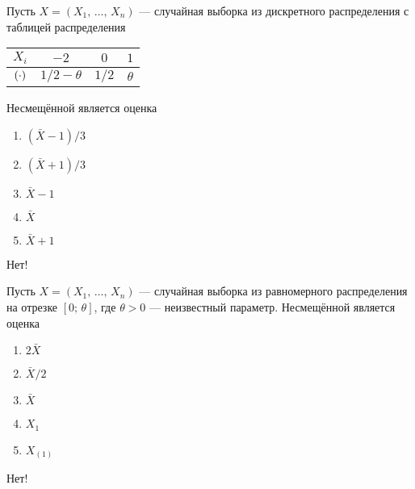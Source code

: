 \documentclass[t]{beamer}
\let\P\relax
\DeclareMathOperator{\P}{\mathbb{P}}
\begin{document}
 \begin{frame} \label{26-No} 
\begin{block}{26} 

    Пусть $X = (X_1, \, \ldots, \, X_n)$ — случайная выборка из дискретного распределения с таблицей распределения

\begin{center}
	\begin{tabular}{cccc}
		\toprule
		$X_i$  & $-2$    & $0$      & $1$  \\
		\midrule
		$\P(\cdot)$        & $1/2 - \theta$      & $1/2$    & $\theta$  \\
		\bottomrule
	\end{tabular}
\end{center}

Несмещённой является оценка


 \end{block} 
\begin{enumerate} 
\item[] \hyperlink{26-No}{\beamergotobutton{} $(\bar{X} - 1) / 3$}
\item[] \hyperlink{26-Yes}{\beamergotobutton{} $(\bar{X} + 1) / 3$}
\item[] \hyperlink{26-No}{\beamergotobutton{} $\bar{X} - 1$}
\item[] \hyperlink{26-No}{\beamergotobutton{} $\bar{X}$}
\item[] \hyperlink{26-No}{\beamergotobutton{} $\bar{X} + 1$}
\end{enumerate} 

 \alert{Нет!} 
\end{frame} 


 \begin{frame} \label{27-No} 
\begin{block}{27} 

   Пусть $X = (X_1, \, \ldots, \, X_n)$ — случайная выборка из равномерного распределения на отрезке $[0; \, \theta]$, где $\theta > 0$ — неизвестный параметр. Несмещённой является оценка


 \end{block} 
\begin{enumerate} 
\item[] \hyperlink{27-Yes}{\beamergotobutton{} $2 \bar{X}$}
\item[] \hyperlink{27-No}{\beamergotobutton{} $\bar{X} / 2$}
\item[] \hyperlink{27-No}{\beamergotobutton{} $\bar{X}$}
\item[] \hyperlink{27-No}{\beamergotobutton{} $X_1$}
\item[] \hyperlink{27-No}{\beamergotobutton{} $X_{(1)}$}
\end{enumerate} 

 \alert{Нет!} 
\end{frame} 
\end{document}
